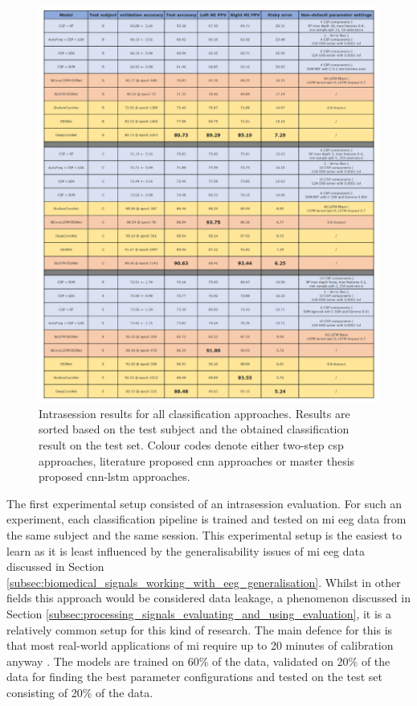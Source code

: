 \begin{figure}[!p]
    \centering
    \includegraphics[width=\linewidth]{../images/results/intrasession.pdf}
    \captionsetup{width=\linewidth}
    \captionsetup{justification=centering}
    \caption{Intrasession results for all classification approaches. Results are sorted based on the test subject and the obtained classification result on the test set. Colour codes denote either two-step \gls{csp} approaches, literature proposed \gls{cnn} approaches or master thesis proposed \gls{cnn}-\gls{lstm} approaches.} 
    \label{fig:results_intrasession}
\end{figure}


The first experimental setup consisted of an intrasession evaluation.
For such an experiment, each classification pipeline is trained and tested on \gls{mi} \gls{eeg} data from the same subject and the same session.
This experimental setup is the easiest to learn as it is least influenced by the generalisability issues of \gls{mi} \gls{eeg} data discussed in Section \ref{subsec:biomedical_signals_working_with_eeg_generalisation}.
Whilst in other fields this approach would be considered data leakage, a phenomenon discussed in Section \ref{subsec:processing_signals_evaluating_and_using_evaluation}, it is a relatively common setup for this kind of research.
The main defence for this is that most real-world applications of \gls{mi} require up to 20 minutes of calibration anyway \citep{eeg_model_eegnet}.
The models are trained on 60\% of the data, validated on 20\% of the data for finding the best parameter configurations and tested on the test set consisting of 20\% of the data.

